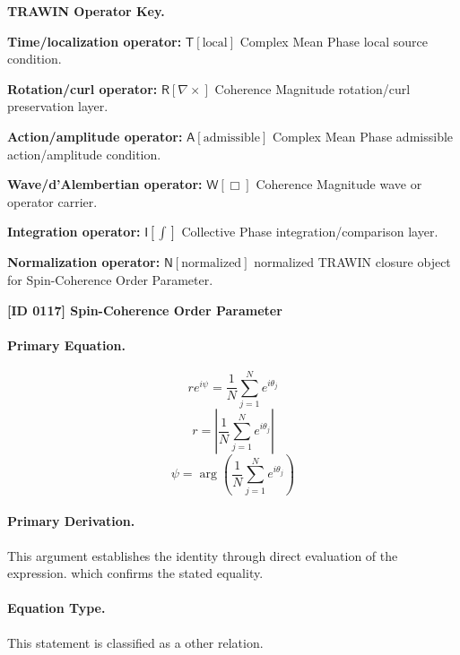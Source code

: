 \par\vspace{0.45\baselineskip}
\noindent\begin{minipage}[t]{\linewidth}
\begingroup
\small
\raggedright
\textbf{TRAWIN Operator Key.}\par
\noindent\textbf{Time/localization operator:} $\mathsf{T}\!\left[\mathrm{local}\right]$ Complex Mean Phase local source condition.\par
\noindent\textbf{Rotation/curl operator:} $\mathsf{R}\!\left[\nabla\times\right]$ Coherence Magnitude rotation/curl preservation layer.\par
\noindent\textbf{Action/amplitude operator:} $\mathsf{A}\!\left[\mathrm{admissible}\right]$ Complex Mean Phase admissible action/amplitude condition.\par
\noindent\textbf{Wave/d'Alembertian operator:} $\mathsf{W}\!\left[\Box\right]$ Coherence Magnitude wave or operator carrier.\par
\noindent\textbf{Integration operator:} $\mathsf{I}\!\left[\int\right]$ Collective Phase integration/comparison layer.\par
\noindent\textbf{Normalization operator:} $\mathsf{N}\!\left[\mathrm{normalized}\right]$ normalized TRAWIN closure object for Spin-Coherence Order Parameter.\par
\endgroup
\end{minipage}

\clearpage
\noindent\textbf{[ID 0117] Spin-Coherence Order Parameter}\par
\vspace{0.35em}
\paragraph{Primary Equation.}
\[
r e^{i\psi} = \frac{1}{N}\sum_{j=1}^{N} e^{i\theta_j}
\]
\[
r = \left|\frac{1}{N}\sum_{j=1}^{N} e^{i\theta_j}\right|
\]
\[
\psi = \arg\!\left(\frac{1}{N}\sum_{j=1}^{N} e^{i\theta_j}\right)
\]

\paragraph{Primary Derivation.}
This argument establishes the identity through direct evaluation of the expression. which confirms the stated equality.
\paragraph{Equation Type.}
This statement is classified as a other relation.

